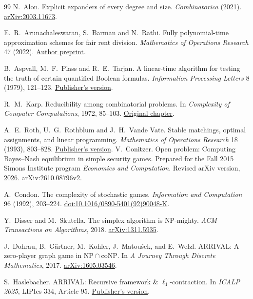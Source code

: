 \documentclass[11pt,oneside,openany,notitlepage]{report}
\begin{document}
\cleardoublepage
{}
{}
\begin{thebibliography}{99}
N.~Alon. Explicit expanders of every degree and size.
\emph{Combinatorica} (2021).
\href{https://arxiv.org/abs/2003.11673}{arXiv:2003.11673}.

E.~R.~Arunachaleswaran, S.~Barman and N.~Rathi. Fully polynomial-time
approximation schemes for fair rent division.
\emph{Mathematics of Operations Research} 47 (2022).
\href{https://arxiv.org/abs/1807.04163}{Author preprint}.

B.~Aspvall, M.~F.~Plass and R.~E.~Tarjan. A linear-time algorithm for
testing the truth of certain quantified Boolean formulas.
\emph{Information Processing Letters} 8 (1979), 121--123.
\href{https://doi.org/10.1016/0020-0190(79)90002-4}{Publisher's version}.

R.~M.~Karp. Reducibility among combinatorial problems. In
\emph{Complexity of Computer Computations}, 1972, 85--103.
\href{https://doi.org/10.1007/978-1-4684-2001-2_9}{Original chapter}.

A.~E.~Roth, U.~G.~Rothblum and J.~H.~Vande Vate. Stable matchings,
optimal assignments, and linear programming.
\emph{Mathematics of Operations Research} 18 (1993), 803--828.
\href{https://doi.org/10.1287/moor.18.4.803}{Publisher's version}.
V.~Conitzer. Open problem: Computing Bayes--Nash equilibrium in simple
security games. Prepared for the Fall 2015 Simons Institute program
\emph{Economics and Computation}. Revised arXiv version, 2026.
\href{https://arxiv.org/abs/2610.08796v2}{arXiv:2610.08796v2}.

A.~Condon. The complexity of stochastic games.
\emph{Information and Computation} 96 (1992), 203--224.
\href{https://doi.org/10.1016/0890-5401(92)90048-K}{doi:10.1016/0890-5401(92)90048-K}.

Y.~Disser and M.~Skutella. The simplex algorithm is NP-mighty.
\emph{ACM Transactions on Algorithms}, 2018.
\href{https://arxiv.org/abs/1311.5935}{arXiv:1311.5935}.

J.~Dohrau, B.~G\"artner, M.~Kohler, J.~Matou\v{s}ek, and E.~Welzl.
ARRIVAL: A zero-player graph game in \(\mathrm{NP}\cap\mathrm{coNP}\).
In \emph{A Journey Through Discrete Mathematics}, 2017.
\href{https://arxiv.org/abs/1605.03546}{arXiv:1605.03546}.

S.~Haslebacher. ARRIVAL: Recursive framework \& \(\ell_1\)-contraction.
In \emph{ICALP 2025}, LIPIcs 334, Article 95.
\href{https://doi.org/10.4230/LIPIcs.ICALP.2025.95}{Publisher's version}.


\end{thebibliography}
\end{document}
